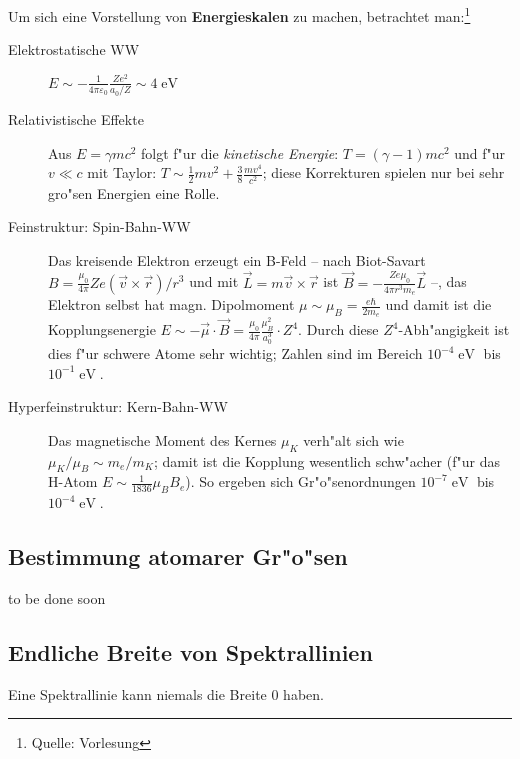 \documentclass[a4paper,draft]{article}
\begin{document}
Um sich eine Vorstellung von \textbf{Energieskalen} zu machen,
betrachtet man:\footnote{Quelle: Vorlesung}
\begin{description}
\item[Elektrostatische WW] $E \sim -\frac{1}{4\pi \varepsilon_0}
  \frac{Z e^2}{a_0 / Z} \sim 4 \operatorname{eV}$
\item[Relativistische Effekte] Aus $E = \gamma m c^2$ folgt f"ur die
  \emph{kinetische Energie}: $T = (\gamma-1) m c^2$ und f"ur $v \ll c$
  mit Taylor: $T \sim \frac{1}{2}mv^2 + \frac{3}{8}\frac{mv^4}{c^2}$;
  diese Korrekturen spielen nur bei sehr gro"sen Energien eine Rolle.
\item[Feinstruktur: Spin-Bahn-WW] Das kreisende Elektron erzeugt ein
  B-Feld -- nach Biot-Savart $B = \frac{\mu_0}{4\pi} Z e (\vec v
  \times \vec r) / r^3$ und mit $\vec L = m \vec v \times \vec r$ ist
  $\vec B = - \frac{Z e \mu_0}{4\pi r^3 m_e}\vec L$ --, das Elektron
  selbst hat magn. Dipolmoment $\mu \sim \mu_B = \frac{e\hbar}{2m_e}$
  und damit ist die Kopplungsenergie $E \sim - \vec \mu \cdot \vec B =
  \frac{\mu_0}{4\pi} \frac{\mu_B^2}{a_0^3}\cdot Z^4$. Durch diese
  $Z^4$-Abh"angigkeit ist dies f"ur schwere Atome sehr wichtig; Zahlen
  sind im Bereich $10^{-4}\operatorname{eV}$ bis $10^{-1}\operatorname{eV}$.
\item[Hyperfeinstruktur: Kern-Bahn-WW] Das magnetische Moment des
  Kernes $\mu_K$ verh"alt sich wie $\mu_K / \mu_B \sim m_e/m_K$; damit
  ist die Kopplung wesentlich schw"acher (f"ur das H-Atom $E \sim
  \frac{1}{1836}\mu_B B_e$). So ergeben sich Gr"o"senordnungen
  $10^{-7}\operatorname{eV}$ bis $10^{-4}\operatorname{eV}$.
\end{description}





\subsection{Bestimmung atomarer Gr"o"sen}
\label{sec:bestimmung_atomarer_grosen}


to be done soon



\subsection{Endliche Breite von Spektrallinien}
\label{sec:endliche_breite_von_spektrallinien}

\begin{Wichtig}
  Eine Spektrallinie kann niemals die Breite $0$ haben.
\end{Wichtig}
\end{document}
